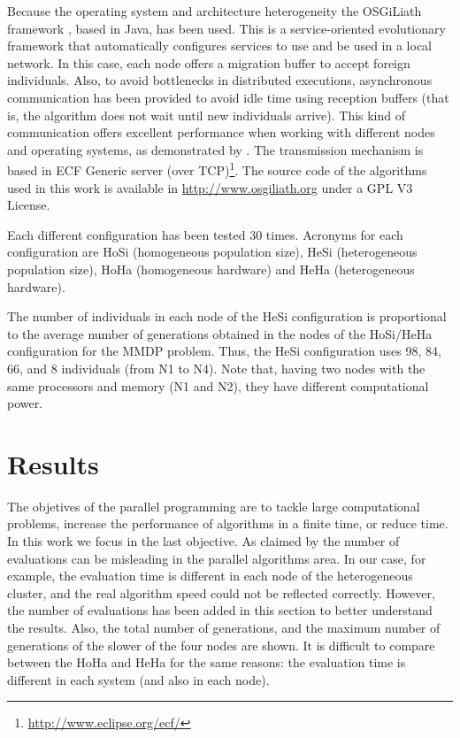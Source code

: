 Because the operating system and architecture heterogeneity the OSGiLiath framework \cite{OSGILIATH}, based in Java, has been used. This is a service-oriented evolutionary framework that automatically configures services to use and be used in a local network. In this case, each node offers a migration buffer to accept foreign individuals. Also, to avoid bottlenecks in distributed executions, asynchronous communication has been provided to avoid idle time using reception buffers (that is, the algorithm does not wait until new individuals arrive). This kind of communication offers excellent performance when working with different nodes and operating systems, as demonstrated by \cite{HETEROGENEOUSHARD}. The transmission mechanism is based in ECF Generic server (over TCP)\footnote{\url{http://www.eclipse.org/ecf/}}. The source code of the algorithms used in this work is available in \url{http://www.osgiliath.org} under a GPL V3 License.

Each different configuration has been tested 30 times. Acronyms for each configuration are HoSi (homogeneous population size), HeSi (heterogeneous population size), HoHa (homogeneous hardware) and HeHa (heterogeneous hardware). 

The number of individuals in each node of the HeSi configuration is proportional to the average number of generations obtained in the nodes of the HoSi/HeHa configuration for the MMDP problem. Thus, the HeSi configuration uses 98, 84, 66, and 8 individuals (from N1 to N4). Note that, having two nodes with the same processors and memory (N1 and N2), they have different computational power.

\section{Results}
\label{sec:results}

The objetives of the parallel programming are to tackle large computational problems, increase the performance of algorithms in a finite time, or reduce time. In this work we focus in the last objective.
As claimed by \cite{EVALUATIONPARALLEL} the number of evaluations can be misleading in the parallel algorithms area. In our case, for example, the evaluation time is different in each node of the heterogeneous cluster, and the real algorithm speed could not be reflected correctly. However, the number of evaluations has been added in this section to better understand the results. Also, the total number of generations, and the maximum number of generations of the slower of the four nodes are shown. It is difficult to compare between the HoHa and HeHa for the same reasons: the evaluation time is different in each system (and also in each node).

